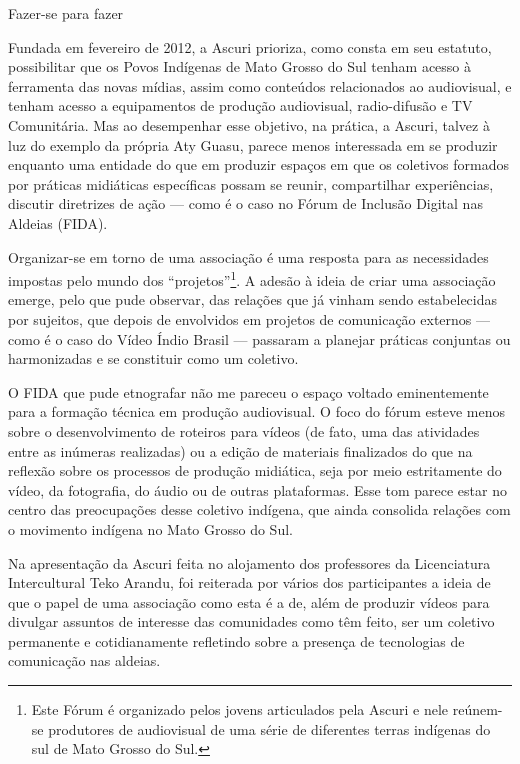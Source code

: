 \documentclass{article}
\begin{document}
Fazer-se para fazer

Fundada em fevereiro de 2012, a Ascuri prioriza, como consta em seu
estatuto, {\textquotedbl}possibilitar que os Povos Ind\'igenas de Mato
Grosso do Sul tenham acesso \`a ferramenta das novas m\'idias, assim
como conte\'udos relacionados ao audiovisual, e tenham acesso a
equipamentos de produ\c{c}\~ao audiovisual, radio-difus\~ao e TV
Comunit\'aria{\textquotedbl}. Mas ao desempenhar esse objetivo, na
pr\'atica, a Ascuri, talvez \`a luz do exemplo da pr\'opria Aty Guasu,
parece menos interessada em se produzir enquanto uma entidade do que em
produzir espa\c{c}os em que os coletivos formados por pr\'aticas
midi\'aticas espec\'ificas possam se reunir, compartilhar
experi\^encias, discutir diretrizes de a\c{c}\~ao --- como \'e o caso
no F\'orum de Inclus\~ao Digital nas Aldeias (FIDA).

Organizar-se em torno de uma associa\c{c}\~ao \'e uma resposta para as
necessidades impostas pelo mundo dos
{\textquotedblleft}projetos{\textquotedblright}\footnote{ Este F\'orum
\'e organizado pelos jovens articulados pela Ascuri e nele re\'unem-se
produtores de audiovisual de uma s\'erie de diferentes terras
ind\'igenas do sul de Mato Grosso do Sul. }. A ades\~ao \`a ideia de
criar uma associa\c{c}\~ao emerge, pelo que pude observar, das
rela\c{c}\~oes que j\'a vinham sendo estabelecidas por sujeitos, que
depois de envolvidos em projetos de comunica\c{c}\~ao externos --- como
\'e o caso do V\'ideo \'Indio Brasil --- passaram a planejar pr\'aticas
conjuntas ou harmonizadas e se constituir como um coletivo.

O FIDA que pude etnografar n\~ao me pareceu o espa\c{c}o voltado
eminentemente para a forma\c{c}\~ao t\'ecnica em produ\c{c}\~ao
audiovisual. O foco do f\'orum esteve menos sobre o desenvolvimento de
roteiros para v\'ideos (de fato, uma das atividades entre as in\'umeras
realizadas) ou a edi\c{c}\~ao de materiais finalizados do que na
reflex\~ao sobre os processos de produ\c{c}\~ao midi\'atica, seja por
meio estritamente do v\'ideo, da fotografia, do \'audio ou de outras
plataformas. Esse tom parece estar no centro das preocupa\c{c}\~oes
desse coletivo ind\'igena, que ainda consolida rela\c{c}\~oes com o
movimento ind\'igena no Mato Grosso do Sul.

Na apresenta\c{c}\~ao da Ascuri feita no alojamento dos professores da
Licenciatura Intercultural Teko Arandu, foi reiterada por v\'arios dos
participantes a ideia de que o papel de uma associa\c{c}\~ao como esta
\'e a de, al\'em de produzir v\'ideos para divulgar assuntos de
interesse das comunidades como t\^em feito, ser um coletivo permanente
e cotidianamente refletindo sobre a presen\c{c}a de tecnologias de
comunica\c{c}\~ao nas aldeias.
\end{document}
